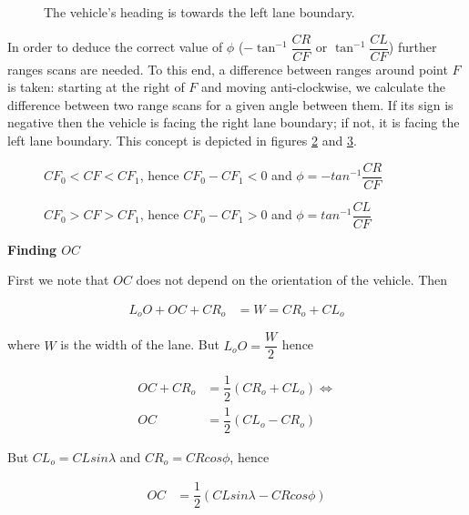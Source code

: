\begin{figure}[H]\centering
  \scalebox{1}{}
  \caption{The vehicle's heading is towards the left lane boundary.}
  \label{}
\end{figure}

In order to deduce the correct value of $\phi$ ($-\tan^{-1}\dfrac{CR}{CF}$ or
$\tan^{-1}\dfrac{CL}{CF}$) further ranges scans are needed. To this end,
a difference between ranges around point $F$ is taken: starting at the
right of $F$ and moving anti-clockwise, we calculate the difference between
two range scans for a given angle between them. If its sign
is negative then the vehicle is facing the right lane boundary; if not,
it is facing the left lane boundary. This concept is depicted in figures
\ref{fig:range_mpc_diff_negative} and  \ref{fig:range_mpc_diff_positive}.

\begin{figure}[H]\centering
  \scalebox{1}{}
  \caption{$CF_0 < CF < CF_1$, hence $CF_0 - CF_1 < 0$ and $\phi = -tan^{-1} \dfrac{CR}{CF}$}
  \label{fig:range_mpc_diff_negative}
\end{figure}

\begin{figure}[H]\centering
  \scalebox{1}{}
  \caption{$CF_0 > CF > CF_1$, hence $CF_0 - CF_1 > 0$ and $\phi = tan^{-1} \dfrac{CL}{CF}$}
  \label{fig:range_mpc_diff_positive}
\end{figure}


\textbf{Finding $OC$}

First we note that $OC$ does not depend on the orientation of the vehicle. Then

\begin{align}
  L_o O + OC + CR_o &= W = CR_o + CL_o
\end{align}

where $W$ is the width of the lane. But $L_o O = \dfrac{W}{2}$ hence

\begin{align}
  OC + CR_o &= \dfrac{1}{2}(CR_o + CL_o) \Leftrightarrow \\
  OC &= \dfrac{1}{2}(CL_o - CR_o)
\end{align}

But $CL_o = CL sin\lambda$ and $CR_o = CR cos\phi$, hence


\begin{align}
  OC &= \dfrac{1}{2}(CL sin\lambda - CR cos\phi)
\end{align}

